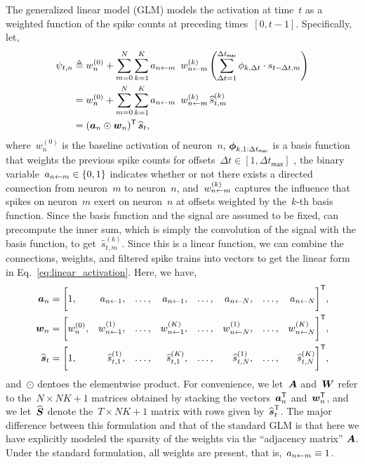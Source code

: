 The generalized linear model (GLM) \cite{Paninski-2004, Truccolo-2005, Pillow-2008} 
models the activation at time~$t$ as a weighted function of 
the spike counts at preceding times~${[0,t-1]}$. Specifically,
let,
\begin{align}
  \label{eq:glm_activation}
  \psi_{t,n} &\triangleq w_n^{(0)}  +                 
               \sum_{m=0}^N  \sum_{k=1}^K a_{n \from m} \, w_{n \from m}^{(k)}
               \left( \sum_{\Delta t=1}^{\Delta t_{\mathsf{max}}} \phi_{k, \Delta t} \cdot s_{t-\Delta t, m} \right) \\
             &= w_n^{(0)}  + \sum_{m=0}^N \sum_{k=1}^K a_{n \from m} \, w_{n \from m}^{(k)} \, \widehat{s}_{t,m}^{(k)} \\
  \label{eq:linear_activation}
             &= (\ba_{n} \odot \bw_n)^\trans \, \widehat{\bs}_t,
\end{align}
where~$w_n^{(0)}$ is the baseline activation of neuron~$n$,
$\boldsymbol{\phi}_{k,1:\Delta t_{\mathsf{max}}}$ is a basis function 
that weights the previous spike counts for 
offsets~${\Delta t \in [1, \Delta t_{\mathsf{max}}]}$
, the binary variable~${a_{n \leftarrow m} \in \{0,1\}}$ 
indicates whether or not there exists 
a directed connection from neuron~$m$ to neuron~$n$,
and~$w_{n \leftarrow m}^{(k)}$ captures the influence that
spikes on neuron~$m$ exert on neuron~$n$ at
offsets weighted by the~$k$-th basis function.  
Since the basis function and the signal 
are assumed to be fixed,  can precompute the inner sum, which is simply the 
convolution of the signal with the basis function, to get~$\widehat{s}_{t,m}^{(k)}$.
Since this is a linear function, we can combine the
connections, weights, and filtered spike trains into
vectors to get the linear form  in Eq.~\ref{eq:linear_activation}.
Here, we have,
\begin{align}
  \boldsymbol{a}_n &=
    \bigg[
      1,  
      &a_{n \leftarrow 1}, & & \ldots, & & a_{n \leftarrow 1}, 
      & & \ldots, &
      &a_{n \leftarrow N}, & & \ldots, & &a_{n \leftarrow N} 
    &\bigg]^{\mathsf{T}}, \\
  \boldsymbol{w}_n &=
    \bigg[
      w_n^{(0)}, 
      &w_{n \leftarrow 1}^{(1)}, & & \ldots, & &w_{n \leftarrow 1}^{(K)}, 
      & &\ldots, &
      &w_{n \leftarrow N}^{(1)}, & & \ldots, & &w_{n \leftarrow N}^{(K)} 
      &\bigg]^{\mathsf{T}}, \\
  \widehat{\boldsymbol{s}}_t &=
    \bigg[
      1, 
      &\widehat{s}_{t,1}^{(1)}, & & \ldots, & &\widehat{s}_{t,1}^{(K)}, 
      & &\ldots, &
      &\widehat{s}_{t,N}^{(1)}, & & \ldots, & &\widehat{s}_{t,N}^{(K)} 
    &\bigg]^{\mathsf{T}},
\end{align}
and~$\odot$ dentoes the elementwise product. For convenience, we
let~$\boldsymbol{A}$ and~$\boldsymbol{W}$ refer to the~$N \times NK+1$ matrices obtained
by stacking the vectors~$\boldsymbol{a}_n^{\mathsf{T}}$ and~$\boldsymbol{w}_n^{\mathsf{T}}$, and we
let~$\widehat{\boldsymbol{S}}$ denote the~$T \times NK+1$ matrix with rows
given by~$\widehat{\boldsymbol{s}}_t^{\mathsf{T}}$. The major difference between this formulation and that of the standard 
GLM is that here we have explicitly modeled the sparsity of the 
weights via the ``adjacency matrix'' $\boldsymbol{A}$. Under the standard 
formulation, all weights are present, that is,~${a_{n \leftarrow m} \equiv 1}$.

